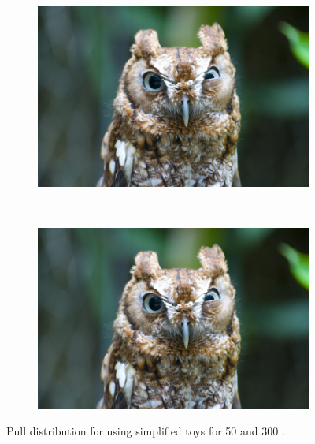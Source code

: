 {\begin{figure}[htbp]
    \centering
   \begin{subfigure}[b]{0.48\textwidth}
        \includegraphics[width= \textwidth]{./Figs/placeholder.jpeg}
    \end{subfigure}
   ~ %
    \begin{subfigure}[b]{0.48\textwidth}
       \includegraphics[width=\textwidth]{./Figs/placeholder.jpeg}
   \end{subfigure}
    \caption{Pull distribution for \tmumu using simplified toys for 50 and 300 \fb.}
    \label{fig:morestatstaupulls}
\end{figure}


}
